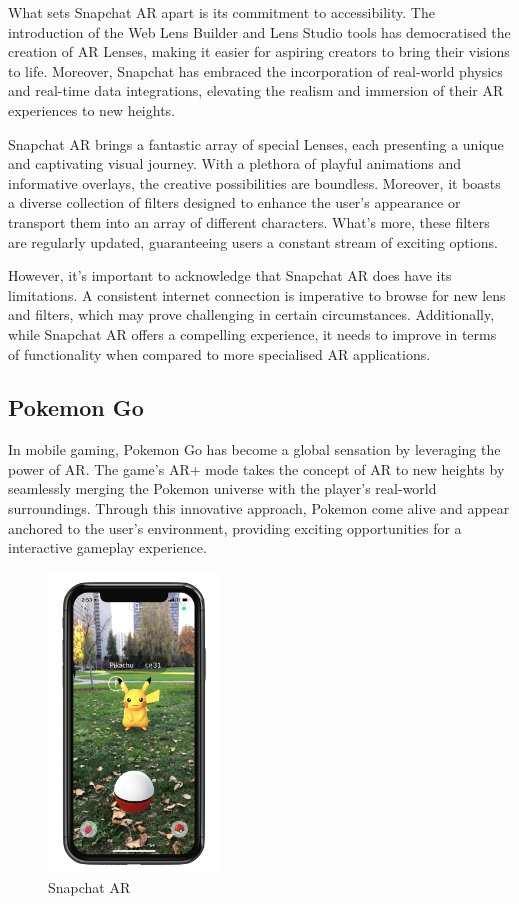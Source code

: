 What sets Snapchat \ac{AR} apart is its commitment to accessibility. The introduction of the Web Lens Builder and Lens Studio tools has democratised the creation of \ac{AR} Lenses, making it easier for aspiring creators to bring their visions to life. Moreover, Snapchat has embraced the incorporation of real-world physics and real-time data integrations, elevating the realism and immersion of their \ac{AR} experiences to new heights.

Snapchat AR brings a fantastic array of special Lenses, each presenting a unique and captivating visual journey. With a plethora of playful animations and informative overlays, the creative possibilities are boundless. Moreover, it boasts a diverse collection of filters designed to enhance the user's appearance or transport them into an array of different characters. What's more, these filters are regularly updated, guaranteeing users a constant stream of exciting options.

However, it's important to acknowledge that Snapchat AR does have its limitations. A consistent internet connection is imperative to browse for new lens and filters, which may prove challenging in certain circumstances. Additionally, while Snapchat \ac{AR} offers a compelling experience, it needs to improve in terms of functionality when compared to more specialised \ac{AR} applications.



\subsection*{Pokemon Go}
In mobile gaming, Pokemon Go has become a global sensation by leveraging the power of \ac{AR}. The game's \ac{AR}+\cite{AR+} mode takes the concept of \ac{AR} to new heights by seamlessly merging the Pokemon universe with the player's real-world surroundings. Through this innovative approach, Pokemon come alive and appear anchored to the user's environment, providing exciting opportunities for a interactive gameplay experience.


\begin{figure}
    \centering
    \includegraphics[width=0.4\textwidth]{img/related-apps/PokemonGO.png}
    \caption{Snapchat AR}
    \label{fig:snapchat}
\end{figure}

